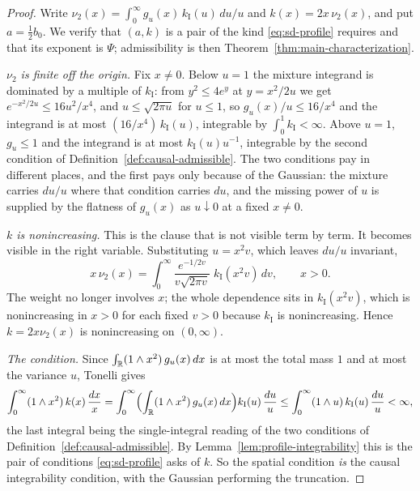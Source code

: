 \begin{proof}
Write $\nu_2(x) = \int_0^\infty g_u(x)\,k_{\mathrm I}(u)\,du/u$ and $k(x) = 2x\,\nu_2(x)$, and
put $a = \tfrac12 b_0$. We verify that $(a,k)$ is a pair of the kind \ref{eq:sd-profile}
requires and that its exponent is $\Psi$; admissibility is then
Theorem~\ref{thm:main-characterization}.

\emph{$\nu_2$ is finite off the origin.} Fix $x \ne 0$. Below $u = 1$ the mixture integrand is
dominated by a multiple of $k_{\mathrm I}$: from $y^2 \le 4e^y$ at $y = x^2/2u$ we get
$e^{-x^2/2u} \le 16u^2/x^4$, and $u \le \sqrt{2\pi u}$ for $u \le 1$, so
$g_u(x)/u \le 16/x^4$ and the integrand is at most $(16/x^4)\,k_{\mathrm I}(u)$, integrable by
$\int_0^1 k_{\mathrm I} < \infty$. Above $u = 1$, $g_u \le 1$ and the integrand is at most
$k_{\mathrm I}(u)u^{-1}$, integrable by the second condition of
Definition~\ref{def:causal-admissible}. The two conditions pay in different places, and the
first pays only because of the Gaussian: the mixture carries $du/u$ where that condition
carries $du$, and the missing power of $u$ is supplied by the flatness of $g_u(x)$ as
$u \downarrow 0$ at a fixed $x \ne 0$.

\emph{$k$ is nonincreasing.} This is the clause that is not visible term by term. It becomes
visible in the right variable. Substituting $u = x^2v$, which leaves $du/u$ invariant,
\begin{equation}\label{eq:bridge-scaling}
  x\,\nu_2(x) = \int_0^\infty \frac{e^{-1/2v}}{v\sqrt{2\pi v}}\;k_{\mathrm I}(x^2v)\,dv ,
  \qquad x > 0 .
\end{equation}
The weight no longer involves $x$; the whole dependence sits in $k_{\mathrm I}(x^2v)$, which is
nonincreasing in $x > 0$ for each fixed $v > 0$ because $k_{\mathrm I}$ is nonincreasing. Hence
$k = 2x\nu_2(x)$ is nonincreasing on $(0,\infty)$.

\emph{The \Levy{} condition.} Since $\int_{\mathbb{R}} (1 \wedge x^2)\,g_u(x)\,dx$ is at most the total mass
$1$ and at most the variance $u$, Tonelli gives
\[
  \int_0^\infty (1 \wedge x^2)\,k(x)\,\frac{dx}{x}
   = \int_0^\infty\Bigl(\int_{\mathbb{R}} (1 \wedge x^2)\,g_u(x)\,dx\Bigr) k_{\mathrm I}(u)\,\frac{du}{u}
   \le \int_0^\infty (1 \wedge u)\,k_{\mathrm I}(u)\,\frac{du}{u} < \infty,
\]
the last integral being the single-integral reading of the two conditions of
Definition~\ref{def:causal-admissible}. By Lemma~\ref{lem:profile-integrability} this is the
pair of conditions \ref{eq:sd-profile} asks of $k$. So the spatial \Levy{} condition \emph{is}
the causal integrability condition, with the Gaussian performing the truncation.


\end{proof}

